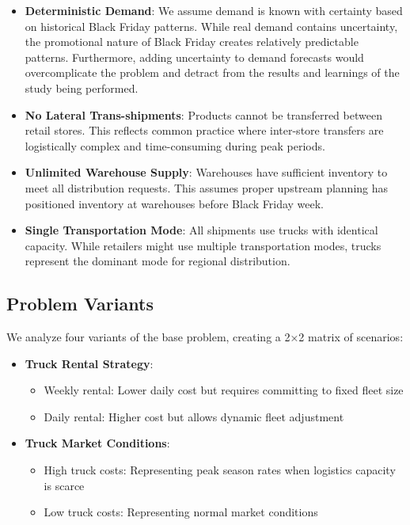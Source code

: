 \documentclass[a4paper,12pt]{article}
\begin{document}
\begin{itemize}
    \item \textbf{Deterministic Demand}: We assume demand is known with certainty based on historical Black Friday patterns.
While real demand contains uncertainty, the promotional nature of Black Friday creates relatively predictable patterns.
Furthermore, adding uncertainty to demand forecasts would overcomplicate the problem and detract from the results and learnings of the study being performed.

    \item \textbf{No Lateral Trans-shipments}: Products cannot be transferred between retail stores.
This reflects common practice where inter-store transfers are logistically complex and time-consuming during peak periods.

    \item \textbf{Unlimited Warehouse Supply}: Warehouses have sufficient inventory to meet all distribution requests.
This assumes proper upstream planning has positioned inventory at warehouses before Black Friday week.

    \item \textbf{Single Transportation Mode}: All shipments use trucks with identical capacity.
While retailers might use multiple transportation modes, trucks represent the dominant mode for regional distribution.
\end{itemize}


\subsection{Problem Variants}\label{subsec:problem-variants}

We analyze four variants of the base problem, creating a 2×2 matrix of scenarios:

\begin{itemize}
    \item \textbf{Truck Rental Strategy}:
    \begin{itemize}
        \item Weekly rental: Lower daily cost but requires committing to fixed fleet size
        \item Daily rental: Higher cost but allows dynamic fleet adjustment
    \end{itemize}

    \item \textbf{Truck Market Conditions}:
    \begin{itemize}
        \item High truck costs: Representing peak season rates when logistics capacity is scarce
        \item Low truck costs: Representing normal market conditions
    \end{itemize}
\end{itemize}
\end{document}
